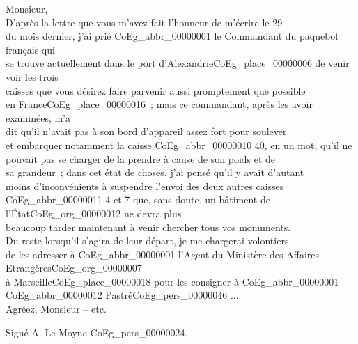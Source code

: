 \documentclass{book}
\begin{document}
\hspace{1cm} Monsieur,\\

\indent D’après la lettre que vous m’avez fait l’honneur de m’écrire le 29\\
du mois dernier, j’ai prié \gls{CoEg_abbr_00000001} le Commandant du paquebot français qui\\
se trouve actuellement dans le port d’Alexandrie\gls{CoEg_place_00000006} de venir voir les trois\\
caisses que vous désirez faire parvenir aussi promptement que possible\\
en France\gls{CoEg_place_00000016}~; mais ce commandant, après les avoir examinées, m’a\\
dit qu’il n’avait pas à son bord d’appareil assez fort pour soulever\\
et embarquer notamment la caisse \gls{CoEg_abbr_00000010} 40, en un mot, qu’il ne\\
pouvait pas se charger de la prendre à cause de son poids et de\\
sa grandeur~; dans cet état de choses, j’ai pensé qu’il y avait d’autant\\
moins d’inconvénients à suspendre l’envoi des deux autres caisses\\
\gls{CoEg_abbr_00000011} 4 et 7 que, sans doute, un bâtiment de l’État\gls{CoEg_org_00000012} ne devra plus\\
beaucoup tarder maintenant à venir chercher tous vos monuments.\\
Du reste lorsqu’il s’agira de leur départ, je me chargerai volontiers\\
de les adresser à \gls{CoEg_abbr_00000001} l’Agent du Ministère des Affaires Etrangères\gls{CoEg_org_00000007}\\
à Marseille\gls{CoEg_place_00000018} pour les consigner à \gls{CoEg_abbr_00000001} \gls{CoEg_abbr_00000012} Pastré\gls{CoEg_pers_00000046} ....\\
\indent Agréez, Monsieur – etc.
\begin{center} \hspace{5cm} Signé A. Le Moyne \gls{CoEg_pers_00000024}.\end{center}

\hypertarget{CoEg_Mariette_1852-09-03}{}
\end{document}
